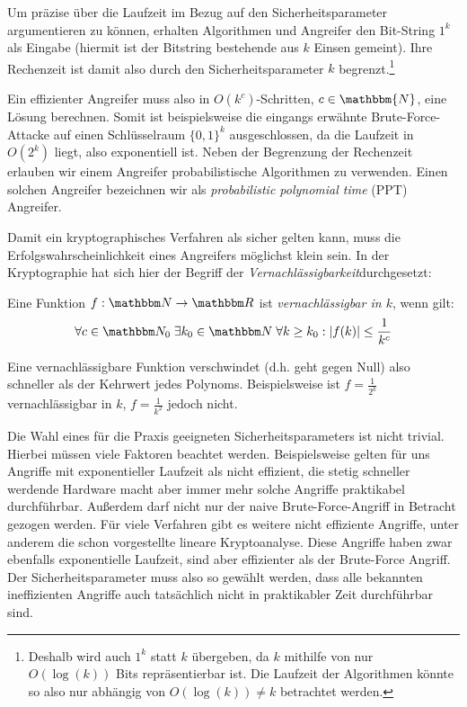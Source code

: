 Um präzise über die Laufzeit im Bezug auf den Sicherheitsparameter
argumentieren zu können, erhalten Algorithmen und Angreifer den
Bit-String $1^k$ als Eingabe (hiermit ist der Bitstring bestehende aus
$k$ Einsen gemeint). Ihre Rechenzeit ist damit also durch den
Sicherheitsparameter $k$ begrenzt.\footnote{Deshalb wird auch $1^k$
  statt $k$ übergeben, da $k$ mithilfe von nur $O(\log(k))$ Bits
  repräsentierbar ist. Die Laufzeit der Algorithmen könnte so also nur
  abhängig von $O(\log(k)) \neq k$ betrachtet werden.}

Ein effizienter Angreifer muss also in $O(k^c)$-Schritten, $c \in
\mathbbm{N}$, eine Lösung berechnen. Somit ist beispielsweise die
eingangs erwähnte Brute-Force-Attacke auf einen Schlüsselraum $\{0,
1\}^{k}$ ausgeschlossen, da die Laufzeit in $O(2^{k})$ liegt, also
exponentiell ist.  Neben der Begrenzung der Rechenzeit erlauben wir
einem Angreifer probabilistische Algorithmen zu verwenden. Einen solchen
Angreifer bezeichnen wir als \emph{probabilistic polynomial time} (PPT)
Angreifer\indexPPTAdv.

Damit ein kryptographisches Verfahren als sicher gelten kann, muss die
Erfolgswahrscheinlichkeit eines Angreifers möglichst \glqq klein\grqq{}
sein. In der Kryptographie hat sich hier der Begriff der
\emph{Vernachlässigbarkeit}\indexNegl durchgesetzt:
\begin{definition}[Vernachlässigbarkeit]\label{def:negl}
 Eine Funktion $f: \N \to \R$
  ist \emph{vernachlässigbar in $k$}, wenn gilt:
  \begin{align*} \forall c \in \N_0 \; \exists k_0 \in \N \;
    \forall k \geq k_0 : \vert f(k) \vert \leq \frac{1}{k^c}
  \end{align*}
\end{definition} Eine vernachlässigbare Funktion \glqq
verschwindet\grqq{} (d.h. geht gegen Null) also schneller als der
Kehrwert jedes Polynoms. Beispielsweise ist $f = \frac{1}{2^k}$
vernachlässigbar in $k$, $f = \frac{1}{k^2}$ jedoch nicht.

Die Wahl eines für die Praxis geeigneten Sicherheitsparameters ist nicht
trivial. Hierbei müssen viele Faktoren beachtet werden. Beispielsweise
gelten für uns Angriffe mit exponentieller Laufzeit als nicht effizient,
die stetig schneller werdende Hardware macht aber immer mehr solche
Angriffe praktikabel durchführbar.  Außerdem darf nicht nur der naive
Brute-Force-Angriff in Betracht gezogen werden. Für viele Verfahren gibt
es weitere nicht effiziente Angriffe, unter anderem die schon
vorgestellte lineare Kryptoanalyse. Diese Angriffe haben zwar ebenfalls
exponentielle Laufzeit, sind aber effizienter als der Brute-Force
Angriff. Der Sicherheitsparameter muss also so gewählt werden, dass alle
bekannten ineffizienten Angriffe auch tatsächlich nicht in praktikabler
Zeit durchführbar sind.

